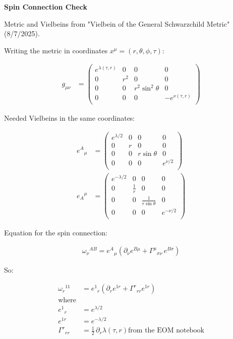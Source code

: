 \documentclass[12pt]{article}
\begin{document}
\begin{center}
  \Large\textbf{Spin Connection Check} \\
  \large{}
\end{center}

Metric and Vielbeins from "Vielbein of the General Schwarzchild Metric" (8/7/2025).

Writing the metric in coordinates $x^\mu = \left(r,\theta,\phi,\tau\right)$:

\begin{align*}
  g_{\mu\nu} &=
  \begin{pmatrix}
    e^{\lambda\left(\tau,r\right)} & 0 & 0 & 0 \\
    0 & r^{2} & 0 & 0 \\
    0 & 0 & r^{2}\sin^{2}\theta & 0 \\
    0 & 0 & 0 & -e^{\nu\left(\tau,r\right)} \\
  \end{pmatrix}
\end{align*}

Needed Vielbeins in the same coordinates:

\begin{align*}
  e^{A}{}_{\mu} &=
  \begin{pmatrix}
    e^{\lambda/2} & 0 & 0 & 0 \\
    0 & r & 0 & 0 \\
    0 & 0 & r\sin\theta & 0 \\
    0 & 0 & 0 & e^{\nu/2} \\
  \end{pmatrix} \\
  e_{A}{}^{\mu} &=
  \begin{pmatrix}
    e^{-\lambda/2} & 0 & 0 & 0 \\
    0 & \frac{1}{r} & 0 & 0 \\
    0 & 0 & \frac{1}{r\sin\theta} & 0 \\
    0 & 0 & 0 & e^{-\nu/2} \\
  \end{pmatrix}
\end{align*}

Equation for the spin connection:

\begin{align*}
  \omega_{\nu}{}^{AB} = e^{A}{}_{\mu}\left(\partial_{\nu} e^{B\mu}+\Gamma^{\mu}{}_{\sigma\nu}\,e^{B\sigma}\right)
\end{align*}

So:

\begin{align*}
  \omega_{r}{}^{11}
  &= e^{1}{}_{r}\left(\partial_{r} e^{1 r}+\Gamma^{r}{}_{r r} e^{1 r}\right) \\ \text{where} \\
  e^{1}{}_{r} &= e^{\lambda/2} \\
  e^{1 r} &= e^{-\lambda/2} \\
  \Gamma^{r}{}_{r r} &= \tfrac{1}{2}\,\partial_{r}\lambda\left(\tau,r\right) \text{from the EOM notebook}
\end{align*}
\end{document}
